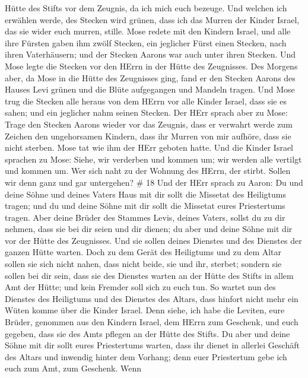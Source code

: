 Hütte des Stifts vor dem Zeugnis, da ich mich euch bezeuge.
 Und welchen ich erwählen werde, des Stecken wird grünen,
dass ich das Murren der Kinder Israel, das sie wider euch murren,
stille.  Mose redete mit den Kindern Israel, und alle ihre
Fürsten gaben ihm zwölf Stecken, ein jeglicher Fürst einen Stecken, nach
ihren Vaterhäusern; und der Stecken Aarons war auch unter ihren Stecken.
 Und Mose legte die Stecken vor den HErrn in der Hütte des
Zeugnisses.  Des Morgens aber, da Mose in die Hütte des
Zeugnisses ging, fand er den Stecken Aarons des Hauses Levi grünen und
die Blüte aufgegangen und Mandeln tragen.  Und Mose trug
die Stecken alle heraus von dem HErrn vor alle Kinder Israel, dass sie
es sahen; und ein jeglicher nahm seinen Stecken.  Der HErr
sprach aber zu Mose: Trage den Stecken Aarons wieder vor das Zeugnis,
dass er verwahrt werde zum Zeichen den ungehorsamen Kindern, dass ihr
Murren von mir aufhöre, dass sie nicht sterben.  Mose tat
wie ihm der HErr geboten hatte.  Und die Kinder Israel
sprachen zu Mose: Siehe, wir verderben und kommen um; wir werden alle
vertilgt und kommen um.  Wer sich naht zu der Wohnung des
HErrn, der stirbt. Sollen wir denn ganz und gar untergehen? \# 18
 Und der HErr sprach zu Aaron: Du und deine Söhne und deines
Vaters Haus mit dir sollt die Missetat des Heiligtums tragen; und du und
deine Söhne mit dir sollt die Missetat eures Priestertums tragen.
 Aber deine Brüder des Stammes Levis, deines Vaters, sollst
du zu dir nehmen, dass sie bei dir seien und dir dienen; du aber und
deine Söhne mit dir vor der Hütte des Zeugnisses.  Und sie
sollen deines Dienstes und des Dienstes der ganzen Hütte warten. Doch zu
dem Gerät des Heiligtums und zu dem Altar sollen sie sich nicht nahen,
dass nicht beide, sie und ihr, sterbet;  sondern sie sollen
bei dir sein, dass sie des Dienstes warten an der Hütte des Stifts in
allem Amt der Hütte; und kein Fremder soll sich zu euch tun.
 So wartet nun des Dienstes des Heiligtums und des Dienstes
des Altars, dass hinfort nicht mehr ein Wüten komme über die Kinder
Israel.  Denn siehe, ich habe die Leviten, eure Brüder,
genommen aus den Kindern Israel, dem HErrn zum Geschenk, und euch
gegeben, dass sie des Amts pflegen an der Hütte des Stifts. 
Du aber und deine Söhne mit dir sollt eures Priestertums warten, dass
ihr dienet in allerlei Geschäft des Altars und inwendig hinter dem
Vorhang; denn euer Priestertum gebe ich euch zum Amt, zum Geschenk. Wenn
